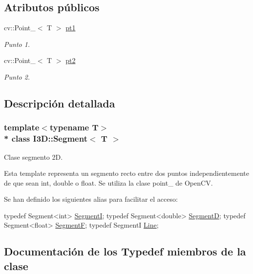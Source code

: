 \subsection*{Atributos públicos}
\begin{DoxyCompactItemize}
\item 
cv\+::\+Point\+\_\+$<$ T $>$ \hyperlink{class_i3_d_1_1_segment_a5d431900fec31fe43607218ba4c382be}{pt1}
\begin{DoxyCompactList}\small\item\em Punto 1. \end{DoxyCompactList}\item 
cv\+::\+Point\+\_\+$<$ T $>$ \hyperlink{class_i3_d_1_1_segment_a15813aa4738a8e5ea4a06ad56fdb0e6d}{pt2}
\begin{DoxyCompactList}\small\item\em Punto 2. \end{DoxyCompactList}\end{DoxyCompactItemize}


\subsection{Descripción detallada}
\subsubsection*{template$<$typename T$>$\\*
class I3\+D\+::\+Segment$<$ T $>$}

Clase segmento 2D. 

Esta template representa un segmento recto entre dos puntos independientemente de que sean int, double o float. Se utiliza la clase point\+\_\+ de Open\+CV.

Se han definido los siguientes alias para facilitar el acceso\+: 
\begin{DoxyCode}
\textcolor{keyword}{typedef} Segment<int> \hyperlink{group___geometric_entities_ga929ca9aa27110ed7f1cf79c92664a6f0}{SegmentI};
\textcolor{keyword}{typedef} Segment<double> \hyperlink{group___geometric_entities_ga34bc194945585b7126a92e06c0571d5a}{SegmentD};
\textcolor{keyword}{typedef} Segment<float> \hyperlink{group___geometric_entities_gade7ab34fb1636ee6e5f7661bd0ae1937}{SegmentF};
\textcolor{keyword}{typedef} SegmentI \hyperlink{group___geometric_entities_ga483b43891a1b33d99406fdc397e9a445}{Line};
\end{DoxyCode}
 

\subsection{Documentación de los \textquotesingle{}Typedef\textquotesingle{} miembros de la clase}

